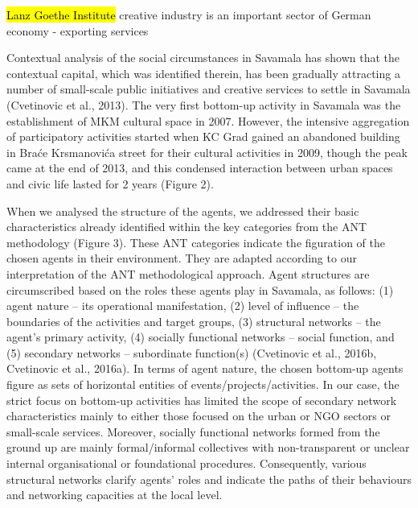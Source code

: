 \documentclass[11pt]{report}
\begin{document}
\hl{Lanz Goethe Institute}
creative industry is an important sector of German economy - exporting services

Contextual analysis of the social circumstances in Savamala has shown that the contextual capital, which was identified therein, has been gradually attracting a number of small-scale public initiatives and creative services to settle in Savamala (Cvetinovic et al., 2013). The very first bottom-up activity in Savamala was the establishment of MKM cultural space in 2007. However, the intensive aggregation of participatory activities started when KC Grad gained an abandoned building in Braće Krsmanovića street for their cultural activities in 2009, though the peak came at the end of 2013, and this condensed interaction between urban spaces and civic life lasted for 2 years (Figure 2).

When we analysed the structure of the agents, we addressed their basic characteristics already identified within the key categories from the ANT methodology (Figure 3). These ANT categories indicate the figuration of the chosen agents in their environment. They are adapted according to our interpretation of the ANT methodological approach. Agent structures are circumscribed based on the roles these agents play in Savamala, as follows: (1) agent nature – its operational manifestation, (2) level of influence – the boundaries of the activities and target groups, (3) structural networks – the agent’s primary activity, (4) socially functional networks – social function, and (5) secondary networks – subordinate function(s) (Cvetinovic et al., 2016b, Cvetinovic et al., 2016a). In terms of agent nature, the chosen bottom-up agents figure as sets of horizontal entities of events/projects/activities. In our case, the strict focus on bottom-up activities has limited the scope of secondary network characteristics mainly to either those focused on the urban or NGO sectors or small-scale services. Moreover, socially functional networks formed from the ground up are mainly formal/informal collectives with non-transparent or unclear internal organisational or foundational procedures. Consequently, various structural networks clarify agents’ roles and indicate the paths of their behaviours and networking capacities at the local level.
\end{document}
